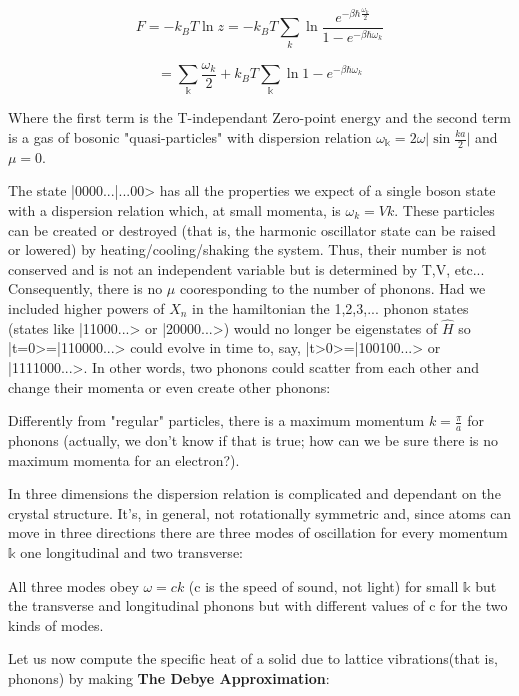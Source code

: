 \documentclass{article}
\newcommand{\bltz}{k_{B}}
\begin{document}
$$F=-\bltz T\ln{z}=-\bltz T\sum_{k}\ln{\frac{e^{-\beta\hbar\frac{\omega_{k}}{2}}}{1-e^{-\beta\hbar\omega_{k}}}}$$

$$=\sum_{\mathbb{k}}\frac{\omega_{k}}{2}+\bltz T\sum_{\mathbb{k}}\ln{1-e^{-\beta\hbar\omega_{k}}}$$

Where the first term is the T-independant Zero-point energy and the second term is a gas of bosonic "quasi-particles" with dispersion relation $\omega_{\mathbb{k}}=2\omega\vert\sin{\frac{ka}{2}}\vert$ and $\mu=0$.


The state |0000...|...00> has all the properties we expect of a single boson state with a dispersion relation which, at small momenta, is $\omega_{k}=Vk$.  These particles can be created or destroyed (that is, the harmonic oscillator state can be raised or lowered) by heating/cooling/shaking the system.  Thus, their number is not conserved and is not an independent variable but is determined by T,V, etc...  Consequently, there is no $\mu$ cooresponding to the number of phonons.  Had we included higher powers of $X_{n}$ in the hamiltonian the 1,2,3,... phonon states (states like |11000...> or |20000...>) would no longer be eigenstates of $\hat{H}$ so |t=0>=|110000...> could evolve in time to, say, |t>0>=|100100...> or |1111000...>.  In other words, two phonons could scatter from each other and change their momenta or even create other phonons:


Differently from "regular" particles, there is a maximum momentum $k=\frac{\pi}{a}$ for phonons (actually, we don't know if that is true; how can we be sure there is no maximum momenta for an electron?).  


In three dimensions the dispersion relation is complicated and dependant on the crystal structure.  It's, in general, not rotationally symmetric and, since atoms can move in three directions there are three modes of oscillation for every momentum $\mathbb{k}$ one longitudinal and two transverse:


All three modes obey $\omega=ck$ (c is the speed of sound, not light) for small $\mathbb{k}$ but the transverse and longitudinal phonons but with different values of c for the two kinds of modes.

Let us now compute the specific heat of a solid due to lattice vibrations(that is, phonons) by making \textbf{The Debye Approximation}:
\end{document}
